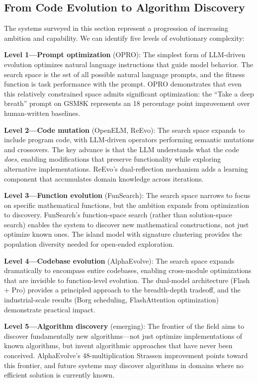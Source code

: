 \subsection{From Code Evolution to Algorithm Discovery}
\label{sec:code-to-algorithm}

The systems surveyed in this section represent a progression of increasing ambition and capability. We can identify five levels of evolutionary complexity:

\textbf{Level 1---Prompt optimization} (OPRO): The simplest form of LLM-driven evolution optimizes natural language instructions that guide model behavior. The search space is the set of all possible natural language prompts, and the fitness function is task performance with the prompt. OPRO demonstrates that even this relatively constrained space admits significant optimization: the ``Take a deep breath'' prompt on GSM8K represents an 18 percentage point improvement over human-written baselines.

\textbf{Level 2---Code mutation} (OpenELM, ReEvo): The search space expands to include program code, with LLM-driven operators performing semantic mutations and crossovers. The key advance is that the LLM understands what the code \emph{does}, enabling modifications that preserve functionality while exploring alternative implementations. ReEvo's dual-reflection mechanism adds a learning component that accumulates domain knowledge across iterations.

\textbf{Level 3---Function evolution} (FunSearch): The search space narrows to focus on specific mathematical functions, but the ambition expands from optimization to discovery. FunSearch's function-space search (rather than solution-space search) enables the system to discover new mathematical constructions, not just optimize known ones. The island model with signature clustering provides the population diversity needed for open-ended exploration.

\textbf{Level 4---Codebase evolution} (AlphaEvolve): The search space expands dramatically to encompass entire codebases, enabling cross-module optimizations that are invisible to function-level evolution. The dual-model architecture (Flash + Pro) provides a principled approach to the breadth-depth tradeoff, and the industrial-scale results (Borg scheduling, FlashAttention optimization) demonstrate practical impact.

\textbf{Level 5---Algorithm discovery} (emerging): The frontier of the field aims to discover fundamentally new algorithms---not just optimize implementations of known algorithms, but invent algorithmic approaches that have never been conceived. AlphaEvolve's 48-multiplication Strassen improvement points toward this frontier, and future systems may discover algorithms in domains where no efficient solution is currently known.

